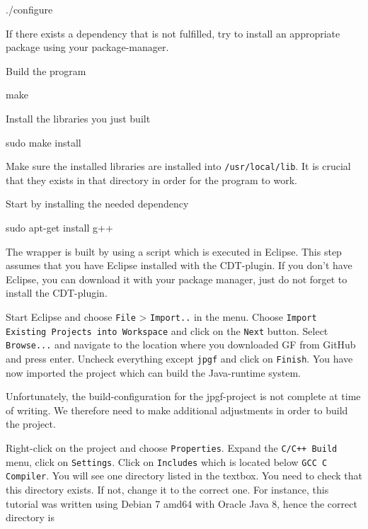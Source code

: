 \begin{terminal}
./configure
\end{terminal}

If there exists a dependency that is not fulfilled, try to install an appropriate package using your package-manager.

Build the program

\begin{terminal}
make
\end{terminal}

Install the libraries you just built

\begin{terminal}
sudo make install
\end{terminal}

Make sure the installed libraries are installed into \texttt{/usr/local/lib}. It is crucial that they exists in that directory in order for the program to work.

Start by installing the needed dependency

\begin{terminal}
sudo apt-get install g++
\end{terminal}

The wrapper is built by using a script which is executed in Eclipse. This step assumes that you have Eclipse installed with the CDT-plugin. If you don't have Eclipse, you can download it with your package manager, just do not forget to install the CDT-plugin.

Start Eclipse and choose \texttt{File} > \texttt{Import..} in the menu. Choose \texttt{Import Existing Projects into Workspace} and click on the \texttt{Next} button. Select \texttt{Browse...} and navigate to the location where you downloaded GF from GitHub and press enter. Uncheck everything except \texttt{jpgf} and click on \texttt{Finish}. You have now imported the project which can build the Java-runtime system. 

Unfortunately, the build-configuration for the jpgf-project is not complete at time of writing. We therefore need to make additional adjustments in order to build the project.

Right-click on the project and choose \texttt{Properties}. Expand the \texttt{C/C++ Build} menu, click on \texttt{Settings}. Click on \texttt{Includes} which is located below \texttt{GCC C Compiler}. You will see one directory listed in the textbox. You need to check that this directory exists. If not, change it to the correct one. For instance, this tutorial was written using Debian 7 amd64 with Oracle Java 8, hence the correct directory is

